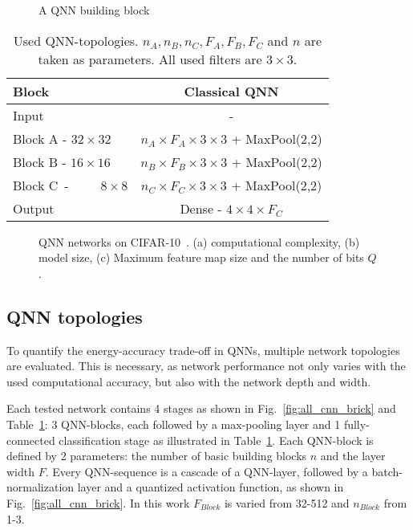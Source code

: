 \documentclass[article,10pt]{IEEEtran}
\begin{document}
\begin{figure}
	\centering
      \hfill
     \caption{A QNN building block}
     \label{steady_state}
\end{figure}
\begin{table}[t]
\centering
\caption{Used QNN-topologies. $n_A,n_B,n_C,F_A,F_B,F_C$ and $n$ are taken as parameters. All used filters are $3\times 3$.}
\label{tab:topologies}
\begin{tabular}{l|c}
\textbf{Block} & \textbf{Classical QNN}  \\ \hline
Input & -  \\ \hline
Block A - $32\times 32$ & $n_A \times F_A \times 3\times 3$  + MaxPool(2,2) \\
Block B - $16\times 16$ & $n_B \times F_B \times 3\times 3$ + MaxPool(2,2)  \\
Block C~-~~~~~$8\times 8$ & $n_C \times F_C \times 3\times 3$  + MaxPool(2,2)  \\ \hline
Output & Dense - $4\times 4\times F_C$  \\
\end{tabular}
\end{table}
\begin{figure*}[!b]
     \centering
     \hfill
     \hfill
     \caption{ QNN networks on CIFAR-10~\cite{krizhevsky2009learning}. (a) computational complexity, (b) model size, (c) Maximum feature map size and the number of bits $Q$. }
     \label{fig:complexity_sizes}
\end{figure*}

\subsection{QNN topologies}
\label{subsec:qnn_topologies}

To quantify the energy-accuracy trade-off in QNNs, multiple network topologies are evaluated. This is necessary, as network performance not only varies with the used computational accuracy, but also with the network depth and width.

Each tested network contains 4 stages as shown in Fig.~\ref{fig:all_cnn_brick} and Table~\ref{tab:topologies}: 3 QNN-blocks, each followed by a max-pooling layer and 1 fully-connected classification stage as illustrated in Table~\ref{tab:topologies}. Each QNN-block is defined by 2 parameters: the number of basic building blocks $n$ and the layer width $F$. Every QNN-sequence is a cascade of a QNN-layer, followed by a batch-normalization layer and a quantized activation function, as shown in Fig.~\ref{fig:all_cnn_brick}. In this work $F_{Block}$ is varied from 32-512 and $n_{Block}$ from 1-3.
\end{document}
